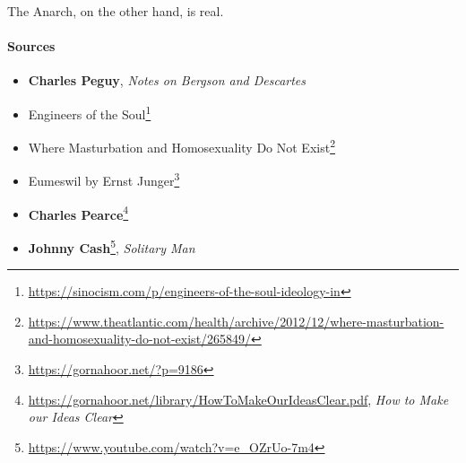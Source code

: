 The Anarch, on the other hand, is real.

\paragraph{Sources}


\begin{itemize}


\item \textbf{Charles Peguy}, \emph{Notes on Bergson and Descartes}


\item Engineers of the Soul\footnote{\url{https://sinocism.com/p/engineers-of-the-soul-ideology-in}}

\item Where Masturbation and Homosexuality Do Not Exist\footnote{\url{https://www.theatlantic.com/health/archive/2012/12/where-masturbation-and-homosexuality-do-not-exist/265849/}}

\item Eumeswil by Ernst Junger\footnote{\url{https://gornahoor.net/?p=9186}}

\item \textbf{Charles Pearce}\footnote{\url{https://gornahoor.net/library/HowToMakeOurIdeasClear.pdf}, \emph{How to Make our Ideas Clear}}


\item \textbf{Johnny Cash}\footnote{\url{https://www.youtube.com/watch?v=e\_OZrUo-7m4}}, \emph{Solitary Man}
\end{itemize} 



